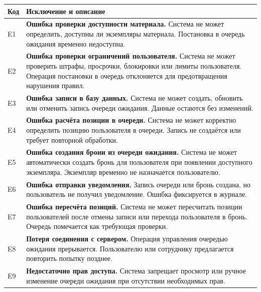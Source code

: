 \documentclass[12pt,a4paper]{article}
\begin{document}
\begin{xltabular}{\textwidth}{
				|>{\raggedright\arraybackslash}p{2.7cm}
				|>{\raggedright\arraybackslash}X|
			}
			
			\textbf{Код} & \textbf{Исключение и описание} \\
			\hline
			
			E1 &
			\textbf{Ошибка проверки доступности материала.}
			Система не может определить, доступны ли экземпляры материала.
			Постановка в очередь ожидания временно недоступна. \\
			\hline
			
			E2 &
			\textbf{Ошибка проверки ограничений пользователя.}
			Система не может проверить штрафы, просрочки, блокировки или лимиты
			пользователя. Операция постановки в очередь отклоняется для
			предотвращения нарушения правил. \\
			\hline
			
			E3 &
			\textbf{Ошибка записи в базу данных.}
			Система не может создать, обновить или отменить запись очереди
			ожидания. Данные остаются без изменений. \\
			\hline
			
			E4 &
			\textbf{Ошибка расчёта позиции в очереди.}
			Система не может корректно определить позицию пользователя в
			очереди. Запись не создаётся или требует повторной обработки. \\
			\hline
			
			E5 &
			\textbf{Ошибка создания брони из очереди ожидания.}
			Система не может автоматически создать бронь для пользователя при
			появлении доступного экземпляра. Экземпляр временно не назначается
			пользователю. \\
			\hline
			
			E6 &
			\textbf{Ошибка отправки уведомления.}
			Запись очереди или бронь создана, но пользователь не получил
			уведомление. Ошибка фиксируется в журнале. \\
			\hline
			
			E7 &
			\textbf{Ошибка пересчёта позиций.}
			Система не может пересчитать позиции пользователей после отмены
			записи или перехода пользователя в бронь. Очередь помечается как
			требующая проверки. \\
			\hline
			
			E8 &
			\textbf{Потеря соединения с сервером.}
			Операция управления очередью ожидания прерывается. Пользователю
			или сотруднику предлагается повторить попытку позднее. \\
			\hline
			
			E9 &
			\textbf{Недостаточно прав доступа.}
			Система запрещает просмотр или ручное изменение очереди ожидания
			при отсутствии необходимых прав. \\
			\hline
			

\end{xltabular}
\end{document}
